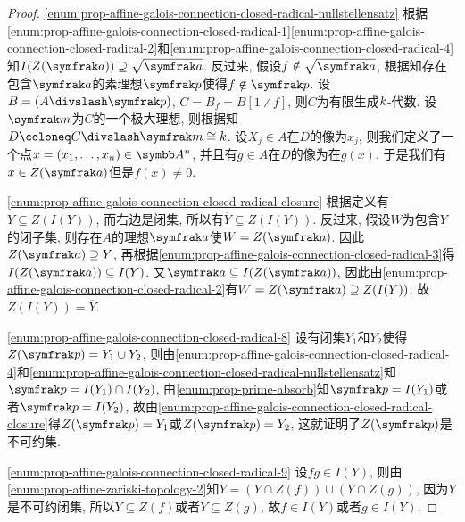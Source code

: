 \begin{proof}
  \ref{enum:prop-affine-galois-connection-closed-radical-nullstellensatz} 根据\ref{enum:prop-affine-galois-connection-closed-radical-1}\ref{enum:prop-affine-galois-connection-closed-radical-2}和\ref{enum:prop-affine-galois-connection-closed-radical-4}知$I(Z(\ideal{a}))\supseteq\sqrt{\ideal{a}}$. 反过来, 假设$f\notin\sqrt{\ideal{a}}$, 根据知存在包含$\ideal{a}$的素理想$\ideal{p}$使得$f\notin\ideal{p}$. 设$B=(A{\divslash}\ideal{p})$, $C=B_{f}=B[1{\divslash}f]$, 则$C$为有限生成$k$-代数. 设$\ideal{m}$为$C$的一个极大理想, 则根据知$D\coloneq C{\divslash}\ideal{m}\cong\kk$. 设$X_j\in A$在$D$的像为$x_j$, 则我们定义了一个点$x=(x_1, \dotsc, x_n)\in \AF^n$, 并且有$g\in A$在$D$的像为在$g(x)$. 于是我们有$x\in Z(\ideal{a})$但是$f(x)\neq 0$.

  \ref{enum:prop-affine-galois-connection-closed-radical-closure} 根据定义有$Y\subseteq Z(I(Y))$, 而右边是闭集, 所以有$\overline{Y}\subseteq Z(I(Y))$. 反过来, 假设$W$为包含$Y$的闭子集, 则存在$A$的理想$\ideal{a}$使$W=Z(\ideal{a})$. 因此$Z(\ideal{a})\supseteq Y$, 再根据\ref{enum:prop-affine-galois-connection-closed-radical-3}得$I(Z(\ideal{a}))\subseteq I(Y)$. 又$\ideal{a}\subseteq I(Z(\ideal{a}))$, 因此由\ref{enum:prop-affine-galois-connection-closed-radical-2}有$W=Z(\ideal{a})\supseteq Z(I(Y))$. 故$Z(I(Y))=\overline{Y}$.

  \ref{enum:prop-affine-galois-connection-closed-radical-8} 设有闭集$Y_1$和$Y_2$使得$Z(\ideal{p})=Y_1\cup Y_2$, 则由\ref{enum:prop-affine-galois-connection-closed-radical-4}和\ref{enum:prop-affine-galois-connection-closed-radical-nullstellensatz}知$\ideal{p}=I(Y_1)\cap I(Y_2)$, 由\ref{enum:prop-prime-absorb}知$\ideal{p}=I(Y_1)$或者$\ideal{p}=I(Y_2)$, 故由\ref{enum:prop-affine-galois-connection-closed-radical-closure}得$Z(\ideal{p})=Y_1$或$Z(\ideal{p})=Y_2$, 这就证明了$Z(\ideal{p})$是不可约集.

  \ref{enum:prop-affine-galois-connection-closed-radical-9} 设$fg\in I(Y)$, 则由\ref{enum:prop-affine-zariski-topology-2}知$Y=(Y\cap Z(f))\cup (Y\cap Z(g))$, 因为$Y$是不可约闭集, 所以$Y\subseteq Z(f)$或者$Y\subseteq Z(g)$, 故$f\in I(Y)$或者$g\in I(Y)$.
\end{proof}

